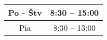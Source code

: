 \begin{center}
\begin{tabular}{|c|c|}
\hline 
Po - Štv & 8:30 -- 15:00 \tabularnewline
\hline 
Pia     & 8:30 -- 13:00 \tabularnewline
\hline
\end{tabular}
\par\end{center}

